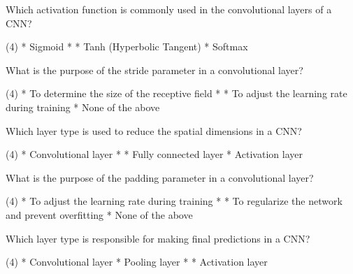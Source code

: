 \documentclass[10pt]{extarticle}
\begin{document}
\begin{exercise}
    Which activation function is commonly used in the convolutional layers of a CNN?
    \begin{choice} (4)
        * Sigmoid
        * 
        * Tanh (Hyperbolic Tangent)
        * Softmax
    \end{choice}
\end{exercise}
\begin{solution}
\end{solution}

\begin{exercise}
    What is the purpose of the stride parameter in a convolutional layer?
    \begin{choice} (4)
        * To determine the size of the receptive field
        * 
        * To adjust the learning rate during training
        * None of the above
    \end{choice}
\end{exercise}
\begin{solution}
\end{solution}

\begin{exercise}
    Which layer type is used to reduce the spatial dimensions in a CNN?
    \begin{choice} (4)
        * Convolutional layer
        * 
        * Fully connected layer
        * Activation layer
    \end{choice}
\end{exercise}
\begin{solution}
\end{solution}

\begin{exercise}
    What is the purpose of the padding parameter in a convolutional layer?
    \begin{choice} (4)
        * To adjust the learning rate during training
        * 
        * To regularize the network and prevent overfitting
        * None of the above
    \end{choice}
\end{exercise}
\begin{solution}
\end{solution}

\begin{exercise}
    Which layer type is responsible for making final predictions in a CNN?
    \begin{choice} (4)
        * Convolutional layer
        * Pooling layer
        * 
        * Activation layer
    \end{choice}
\end{exercise}
\begin{solution}
\end{solution}
\end{document}

